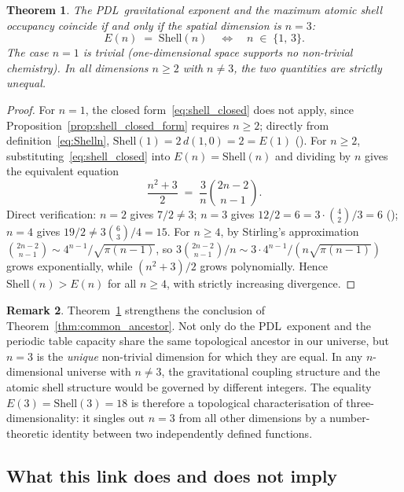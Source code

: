 \documentclass[11pt,a4paper]{article}
\newtheorem{theorem}{Theorem}[section]
\theoremstyle{definition}
\newtheorem{remark}[theorem]{Remark}
\newcommand{\PDL}{\textnormal{PDL}}
\newcommand{\Efun}{E}
\newcommand{\Shell}{\mathrm{Shell}}
\begin{document}
\begin{theorem}
  \label{thm:n_equals_3}
  The \PDL\ gravitational exponent and the maximum atomic shell occupancy coincide if and only if the spatial dimension is $n = 3$:
  \begin{equation}
    \label{eq:n3_unique}
    \Efun(n) \;=\; \Shell(n) \quad\iff\quad n \;\in\; \{1,\, 3\}.
  \end{equation}
  The case $n=1$ is trivial (one-dimensional space supports no non-trivial chemistry). In all dimensions $n \geq 2$ with $n \neq 3$, the two quantities are strictly unequal.
\end{theorem}

\begin{proof}
  For $n = 1$, the closed form~\eqref{eq:shell_closed} does not apply, since Proposition~\ref{prop:shell_closed_form} requires $n \geq 2$; directly from definition~\eqref{eq:Shelln}, $\Shell(1) = 2\,d(1,0) = 2 = \Efun(1)$ (\checkmark). For $n \geq 2$, substituting~\eqref{eq:shell_closed} into $\Efun(n) = \Shell(n)$ and dividing by $n$ gives the equivalent equation
  \[
    \frac{n^2+3}{2} \;=\; \frac{3}{n}\binom{2n-2}{n-1}.
  \]
  Direct verification: $n=2$ gives $7/2 \neq 3$; $n=3$ gives $12/2 = 6 = 3 \cdot \binom{4}{2}/3 = 6$ (\checkmark); $n=4$ gives $19/2 \neq 3\binom{6}{3}/4 = 15$. For $n \geq 4$, by Stirling's approximation $\binom{2n-2}{n-1} \sim 4^{n-1}/\sqrt{\pi(n-1)}$, so $3\binom{2n-2}{n-1}/n \sim 3 \cdot 4^{n-1}/(n\sqrt{\pi(n-1)})$ grows exponentially, while $(n^2+3)/2$ grows polynomially. Hence $\Shell(n) > \Efun(n)$ for all $n \geq 4$, with strictly increasing divergence.
\end{proof}

\begin{remark}
  \label{rem:3d_unique}
  Theorem~\ref{thm:n_equals_3} strengthens the conclusion of Theorem~\ref{thm:common_ancestor}. Not only do the \PDL\ exponent and the periodic table capacity share the same topological ancestor in our universe, but $n=3$ is the \emph{unique} non-trivial dimension for which they are equal. In any $n$-dimensional universe with $n \neq 3$, the gravitational coupling structure and the atomic shell structure would be governed by different integers. The equality $\Efun(3) = \Shell(3) = 18$ is therefore a topological characterisation of three-dimensionality: it singles out $n=3$ from all other dimensions by a number-theoretic identity between two independently defined functions.
\end{remark}

\subsection{What this link does and does not imply}
\label{subsec:limits}
\end{document}
